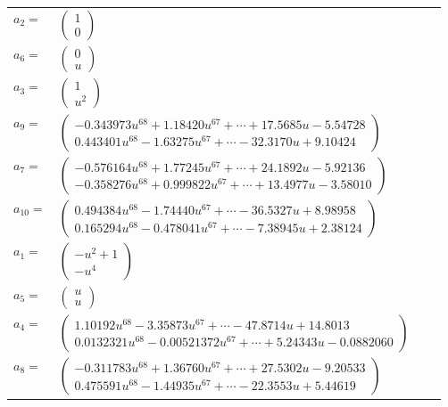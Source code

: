 \documentclass[1p]{elsarticle_modified}
\theoremstyle{definition}
\begin{document}
\begin{tabular}{m{7pt} m{180pt} m{7pt} m{180pt} }
\flushright $a_{2}=$&$\begin{pmatrix}1\\0\end{pmatrix}$ \\
\flushright $a_{6}=$&$\begin{pmatrix}0\\u\end{pmatrix}$ \\
\flushright $a_{3}=$&$\begin{pmatrix}1\\u^2\end{pmatrix}$ \\
\flushright $a_{9}=$&$\begin{pmatrix}-0.343973 u^{68}+1.18420 u^{67}+\cdots+17.5685 u-5.54728\\0.443401 u^{68}-1.63275 u^{67}+\cdots-32.3170 u+9.10424\end{pmatrix}$ \\
\flushright $a_{7}=$&$\begin{pmatrix}-0.576164 u^{68}+1.77245 u^{67}+\cdots+24.1892 u-5.92136\\-0.358276 u^{68}+0.999822 u^{67}+\cdots+13.4977 u-3.58010\end{pmatrix}$ \\
\flushright $a_{10}=$&$\begin{pmatrix}0.494384 u^{68}-1.74440 u^{67}+\cdots-36.5327 u+8.98958\\0.165294 u^{68}-0.478041 u^{67}+\cdots-7.38945 u+2.38124\end{pmatrix}$ \\
\flushright $a_{1}=$&$\begin{pmatrix}- u^2+1\\- u^4\end{pmatrix}$ \\
\flushright $a_{5}=$&$\begin{pmatrix}u\\u\end{pmatrix}$ \\
\flushright $a_{4}=$&$\begin{pmatrix}1.10192 u^{68}-3.35873 u^{67}+\cdots-47.8714 u+14.8013\\0.0132321 u^{68}-0.00521372 u^{67}+\cdots+5.24343 u-0.0882060\end{pmatrix}$ \\
\flushright $a_{8}=$&$\begin{pmatrix}-0.311783 u^{68}+1.36760 u^{67}+\cdots+27.5302 u-9.20533\\0.475591 u^{68}-1.44935 u^{67}+\cdots-22.3553 u+5.44619\end{pmatrix}$ \\

\end{tabular}
\end{document}
